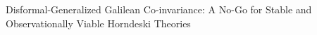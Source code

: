 \documentclass[twocolumn]{aastex631}
\begin{document}
Disformal-Generalized Galilean Co-invariance: A No-Go for Stable and Observationally Viable Horndeski Theories
\end{document}

